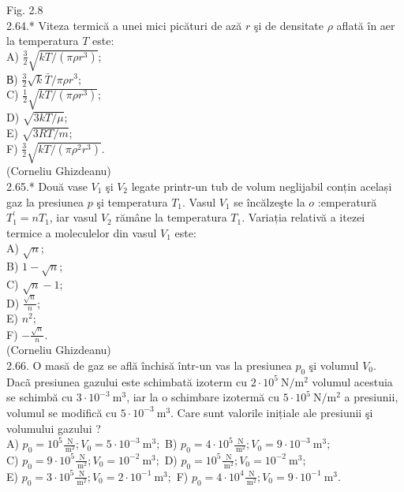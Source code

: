 \documentclass[10pt]{article}
\begin{document}
Fig. 2.8\\
2.64.* Viteza termică a unei mici picături de ază $r$ şi de densitate $\rho$ aflată în aer la temperatura $T$ este:\\
A) $\frac{3}{2} \sqrt{k T /\left(\pi \rho r^{3}\right)}$;\\
В) $\frac{3}{2} \sqrt{k} \bar{T} / \pi \rho r^{3}$;\\
C) $\frac{1}{2} \sqrt{k T /\left(\pi \rho r^{3}\right)}$;\\
D) $\sqrt{3 k T / \mu}$;\\
E) $\sqrt{3 R T / m}$;\\
F) $\frac{3}{2} \sqrt{k T /\left(\pi \rho^{2} r^{3}\right)}$.\\
(Corneliu Ghizdeanu)\\
2.65.* Două vase $V_{1}$ şi $V_{2}$ legate printr-un tub de volum neglijabil conțin același gaz la presiunea $p$ şi temperatura $T_{1}$. Vasul $V_{1}$ se încălzeşte la $o$ :emperatură $T_{1}^{\prime}=n T_{1}$, iar vasul $V_{2}$ rămâne la temperatura $T_{1}$. Variația relativă a itezei termice a moleculelor din vasul $V_{1}$ este:\\
A) $\sqrt{n}$;\\
B) $1-\sqrt{n}$;\\
C) $\sqrt{n}-1$;\\
D) $\frac{\sqrt{n}}{n}$;\\
E) $n^{2}$;\\
F) $-\frac{\sqrt{n}}{n}$.\\
(Corneliu Ghizdeanu)\\
2.66. O masă de gaz se află închisă într-un vas la presiunea $p_{0}$ şi volumul $V_{0}$. Dacã presiunea gazului este schimbată izoterm cu $2 \cdot 10^{5} \mathrm{~N} / \mathrm{m}^{2}$ volumul acestuia se schimbă cu $3 \cdot 10^{-3} \mathrm{~m}^{3}$, iar la o schimbare izotermă cu $5 \cdot 10^{5} \mathrm{~N} / \mathrm{m}^{2}$ a presiunii, volumul se modifică cu $5 \cdot 10^{-3} \mathrm{~m}^{3}$. Care sunt valorile inițiale ale presiunii şi volumului gazului ?\\
A) $p_{0}=10^{5} \frac{\mathrm{~N}}{\mathrm{~m}^{2}} ; V_{0}=5 \cdot 10^{-3} \mathrm{~m}^{3} ;$ B) $p_{0}=4 \cdot 10^{5} \frac{\mathrm{~N}}{\mathrm{~m}^{2}} ; V_{0}=9 \cdot 10^{-3} \mathrm{~m}^{3}$;\\
C) $p_{0}=9 \cdot 10^{5} \frac{\mathrm{~N}}{\mathrm{~m}^{2}} ; V_{0}=10^{-2} \mathrm{~m}^{3} ;$ D) $p_{0}=10^{5} \frac{\mathrm{~N}}{\mathrm{~m}^{2}} ; V_{0}=10^{-2} \mathrm{~m}^{3} ;$\\
E) $p_{0}=3 \cdot 10^{5} \frac{\mathrm{~N}}{\mathrm{~m}^{2}} ; V_{0}=2 \cdot 10^{-1} \mathrm{~m}^{3} ;$ F) $p_{0}=4 \cdot 10^{4} \frac{\mathrm{~N}}{\mathrm{~m}^{2}} ; V_{0}=9 \cdot 10^{-1} \mathrm{~m}^{3}$.\\
\end{document}
